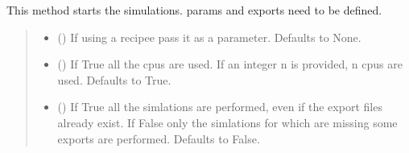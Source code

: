 \documentclass[letterpaper,10pt,english]{sphinxmanual}
\begin{document}
\begin{fulllineitems}
\begin{fulllineitems}
\end{fulllineitems}


\begin{fulllineitems}
\label{\detokenize{index:raypyng.simulate.Simulate.run}}
\pysigstartsignatures
{}
\pysigstopsignatures
\sphinxAtStartPar
This method starts the simulations. params and exports need to be defined.
\begin{quote}\begin{description}
\begin{itemize}
\item {} 
\sphinxAtStartPar
{} (\sphinxstyleliteralemphasis{\sphinxupquote{, }}) \textendash{} If using a recipee pass it as a parameter. Defaults to None.

\item {} 
\sphinxAtStartPar
{} (\sphinxstyleliteralemphasis{\sphinxupquote{, }}) \textendash{} If True all the cpus are used. If an integer n is provided, n cpus are used. Defaults to True.

\item {} 
\sphinxAtStartPar
{} (\sphinxstyleliteralemphasis{\sphinxupquote{, }}) \textendash{} If True all the simlations are performed, even if the export files already exist. If False only the simlations for which are missing some exports are performed. Defaults to False.

\end{itemize}

\end{description}\end{quote}

\end{fulllineitems}


\end{fulllineitems}
\end{document}
